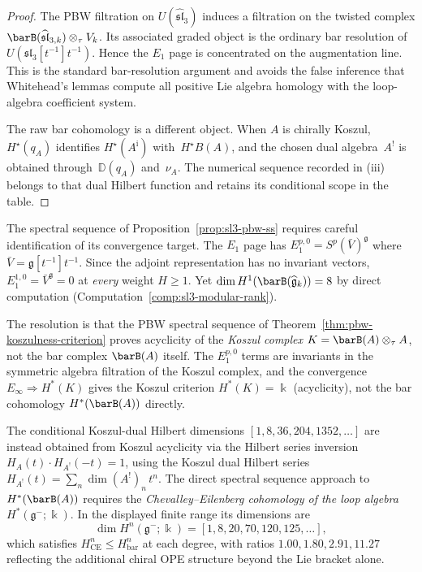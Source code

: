 \begin{proof}
The PBW filtration on $U(\widehat{\mathfrak{sl}}_3)$ induces a filtration
on the twisted complex
$\barB(\widehat{\mathfrak{sl}}_{3,k})\otimes_\tau V_k$. Its associated
graded object is the ordinary bar resolution of
$U(\mathfrak{sl}_3[t^{-1}]t^{-1})$. Hence the $E_1$ page is
concentrated on the augmentation line. This is the standard
bar-resolution argument and avoids the false inference that
Whitehead's lemmas compute all positive Lie algebra homology with the
loop-algebra coefficient system.

The raw bar cohomology is a different object. When $A$ is chirally
Koszul, $H^\star(q_A)$ identifies
$H^\star(A^{\mathrm i})$ with~$H^\star B(A)$, and the chosen dual
algebra~$A^!$ is obtained through~$\mathbb D(q_A)$ and~$\nu_A$. The numerical
sequence recorded in (iii) belongs to that dual Hilbert function and
retains its conditional scope in the table.
\end{proof}

\begin{remark}
\label{rem:pbw-convergence-target}
The spectral sequence of Proposition~\ref{prop:sl3-pbw-ss} requires
careful identification of its convergence target. The $E_1$ page
has $E_1^{p,0} = S^p(\bar{V})^{\mathfrak{g}}$ where
$\bar{V} = \mathfrak{g}[t^{-1}]t^{-1}$.
Since the adjoint representation has no invariant vectors,
$E_1^{1,0} = \bar{V}^{\mathfrak{g}} = 0$
at \emph{every} weight $H \geq 1$. Yet $\dim H^1(\barB(\widehat{\mathfrak{g}}_k)) = 8$
by direct computation (Computation~\ref{comp:sl3-modular-rank}).

The resolution is that the PBW spectral sequence of
Theorem~\ref{thm:pbw-koszulness-criterion} proves acyclicity
of the \emph{Koszul complex} $K = \barB(A) \otimes_\tau A$,
not the bar complex $\barB(A)$ itself. The $E_1^{p,0}$ terms
are invariants in the symmetric algebra filtration of the
Koszul complex, and the convergence
$E_\infty \Rightarrow H^*(K)$ gives the Koszul criterion
$H^*(K) = \Bbbk$ (acyclicity), not the bar cohomology
$H^*(\barB(A))$ directly.

The conditional Koszul-dual Hilbert dimensions
$[1, 8, 36, 204, 1352, \ldots]$ are instead obtained from
Koszul acyclicity via the Hilbert series inversion
$H_A(t) \cdot H_{A^!}(-t) = 1$, using the Koszul dual Hilbert series
$H_{A^!}(t) = \sum_n \dim(A^!)_n \, t^n$.
The direct spectral sequence approach to $H^*(\barB(A))$
requires the \emph{Chevalley--Eilenberg cohomology of the
loop algebra} $H^*(\mathfrak{g}^-; \Bbbk)$.  In the displayed
finite range its dimensions are
\[
\dim H^n(\mathfrak{g}^-; \Bbbk) =
[1, 8, 20, 70, 120, 125, \ldots],
\]
which satisfies $H^n_{\mathrm{CE}} \leq H^n_{\mathrm{bar}}$
at each degree, with ratios $1.00, 1.80, 2.91, 11.27$ reflecting the
additional chiral OPE structure beyond the Lie bracket alone.
\end{remark}

